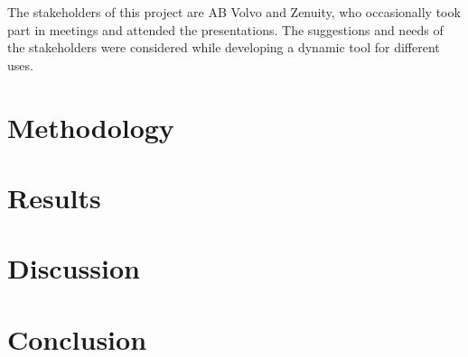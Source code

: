 \documentclass[a4paper]{article}
\begin{document}

The stakeholders of this project are AB Volvo and Zenuity, who occasionally took part in meetings and attended the presentations. The suggestions and needs of the stakeholders were considered while developing a dynamic tool for different uses.








\section{Methodology}
\label{sec:Methodology}
\label{sssec:Manual Tracking}







% 
\section{Results}
\label{sec:Results}



\section{Discussion}
\label{sec:Discussion}




\section{Conclusion}
\label{sec:Conclusion}


\end{document}
